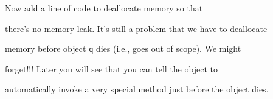 Now add a line of code to deallocate memory so that

there's no memory leak. It's still a problem that we have to deallocate

memory before object \texttt{q} dies (i.e., goes out of scope). We might

forget!!! Later you will see that you can tell the object to

automatically invoke a very special method just before the object dies.

